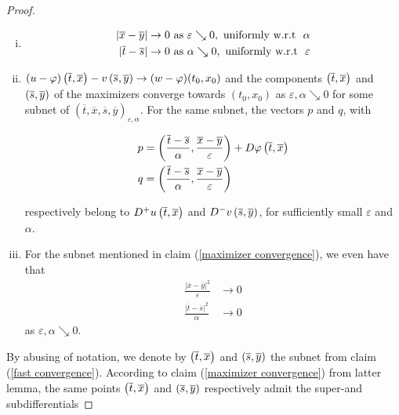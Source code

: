 \begin{theorem}
\begin{proof}
		  		\begin{enumerate}[(i)]
		  			\item
		  			\begin{align*}
		  			\lvert \overline{x} - \overline{y} \rvert &\to 0 \hbox{ as } \varepsilon \searrow 0, \hbox{ uniformly w.r.t } \  \alpha \\
		  			\lvert \overline{t} - \overline{s} \rvert &\to 0 \hbox{ as } \alpha \searrow 0, \hbox{ uniformly w.r.t } \ \varepsilon 
		  			\end{align*}
		  			
		  			\item
		  			$ (u - \varphi)\left(\overline{t}, \overline{x}\right) - v\left(\overline{s}, \overline{y}\right) \to (w - \varphi)(t_0, x_0) $ and the components $ \left(\overline{t}, \overline{x}\right) $ and $ \left(\overline{s}, \overline{y}\right) $ of the maximizers converge towards $ (t_0, x_0) $ as $ \varepsilon, \alpha \searrow 0 $ for some subnet of $ (\overline{t}, \overline{x}, \overline{s}, \overline{y})_{\varepsilon, \alpha} $. 
		  			For the same subnet, the vectors $ p $ and $ q $, with
		  			
		  			\begin{align*}
		  			p &= \left( \frac{\overline{t} - \overline{s}}{\alpha}, \frac{\overline{x} - \overline{y}}{\varepsilon} \right) + D\varphi\left(\overline{t}, \overline{x}\right) \\
		  			q &= \left( \frac{\overline{t} - \overline{s}}{\alpha}, \frac{\overline{x} - \overline{y}}{\varepsilon} \right)
		  			\end{align*}
		  			
		  			respectively belong to $ D^{+}u\left(\overline{t}, \overline{x}\right) $ and $ D^{-}v\left(\overline{s}, \overline{y}\right) $, for sufficiently small $ \varepsilon $ and $ \alpha $.
		  			
		  			\item
		  			For the subnet mentioned in claim (\ref{maximizer convergence}), we even have that
		  			\begin{align*}
		  			\frac{\lvert \overline{x} - \overline{y} \rvert^2}{\varepsilon} &\to 0 \\
		  			\frac{\lvert \overline{t} - \overline{s} \rvert^2}{\alpha} &\to 0 
		  			\end{align*} 
		  			as $ \varepsilon, \alpha \searrow 0 $.
		  		\end{enumerate}
		  		
		  		By abusing of notation, we denote by $ \left(\overline{t}, \overline{x}\right) $ and $ \left(\overline{s}, \overline{y}\right) $ the subnet from claim (\ref{fast convergence}). According to claim (\ref{maximizer convergence}) from latter lemma, the same points $ \left(\overline{t}, \overline{x}\right) $ and $ \left(\overline{s}, \overline{y}\right) $ respectively admit the super-and subdifferentials
		  		

\end{proof}
\end{theorem}
